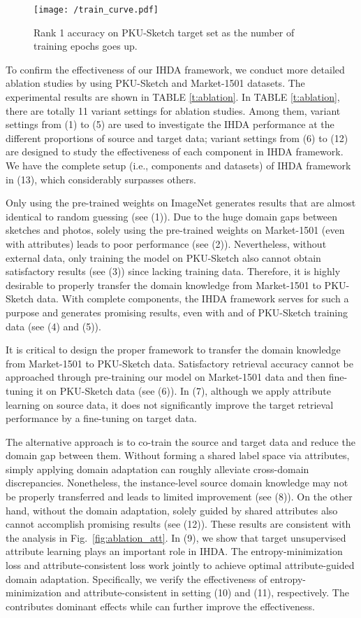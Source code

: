 \documentclass[journal]{IEEEtran}
\begin{document}
\begin{figure}[!ht]
\centering
  \texttt{[image: /train\_curve.pdf]}
  \caption{Rank 1 accuracy on PKU-Sketch target set as the number of training epochs goes up.}
  \label{fig:embed-2}
\end{figure}


To confirm the effectiveness of our IHDA framework, we conduct more detailed ablation studies by using PKU-Sketch and Market-1501 datasets. The experimental results are shown in TABLE \ref{t:ablation}. In TABLE \ref{t:ablation}, there are totally 11 variant settings for ablation studies. Among them, variant settings from (1) to (5) are used to investigate the IHDA performance at the different proportions of source and target data; variant settings from (6) to (12) are designed to study the effectiveness of each component in IHDA framework. We have the complete setup (i.e., components and datasets) of IHDA framework in (13), which considerably surpasses others. 


Only using the pre-trained weights on ImageNet generates results that are almost identical to random guessing (see (1)). Due to the huge domain gaps between sketches and photos, solely using the pre-trained weights on Market-1501 (even with attributes) leads to poor performance (see (2)). Nevertheless, without external data, only training the model on PKU-Sketch also cannot obtain satisfactory results (see (3)) since lacking training data. Therefore, it is highly desirable to properly transfer the domain knowledge from Market-1501 to PKU-Sketch data. With complete components, the IHDA framework serves for such a purpose and generates promising results, even with  and  of PKU-Sketch training data (see (4) and (5)). 

It is critical to design the proper framework to transfer the domain knowledge from Market-1501 to PKU-Sketch data. Satisfactory retrieval accuracy cannot be approached through pre-training our model on Market-1501 data and then fine-tuning it on PKU-Sketch data (see (6)). In (7), although we apply attribute learning on source data, it does not significantly improve the target retrieval performance by a fine-tuning on target data. 

The alternative approach is to co-train the source and target data and reduce the domain gap between them. Without forming a shared label space via attributes, simply applying domain adaptation can roughly alleviate cross-domain discrepancies. Nonetheless, the instance-level source domain knowledge may not be properly transferred and leads to limited improvement (see (8)). On the other hand, without the domain adaptation, solely guided by shared attributes also cannot accomplish promising results (see (12)). These results are consistent with the analysis in Fig.~\ref{fig:ablation_att}. In (9), we show that target unsupervised attribute learning plays an important role in IHDA. The entropy-minimization loss and attribute-consistent loss work jointly to achieve optimal attribute-guided domain adaptation. Specifically, we verify the effectiveness of entropy-minimization and attribute-consistent in setting (10) and (11), respectively. The  contributes dominant effects while  can further improve the effectiveness.
 
\end{document}
